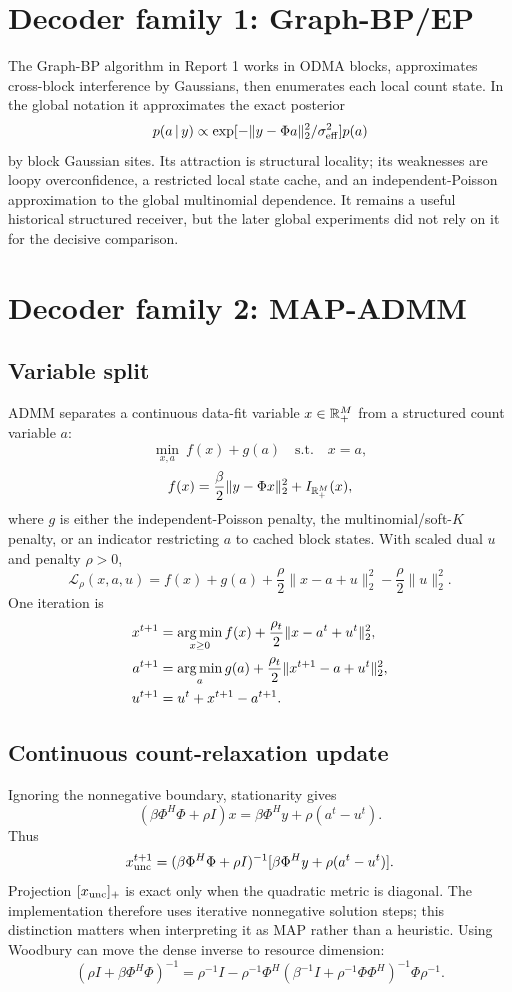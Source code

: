 \documentclass[11pt]{article}
\begin{document}
\section{Decoder family 1: Graph-BP/EP}

The Graph-BP algorithm in Report 1 works in ODMA blocks, approximates cross-block interference by Gaussians, then
enumerates each local count state. In the global notation it approximates the exact posterior
\[
 p(a\,|\, y)\propto
 \exp[-\|y-\Phi a\|_2^2/\sigma_{\rm eff}^2]p(a)
\]
by block Gaussian sites. Its attraction is structural locality; its weaknesses are loopy overconfidence, a restricted
local state cache, and an independent-Poisson approximation to the global multinomial dependence. It remains a useful
historical structured receiver, but the later global experiments did not rely on it for the decisive comparison.

\section{Decoder family 2: MAP-ADMM}

\subsection{Variable split}

ADMM separates a continuous data-fit variable $x\in\mathbb{R}_+^M$ from a structured count variable $a$:
\[
 \min_{x,a}\ f(x)+g(a)\quad\text{s.t.}\quad x=a,
\]
\[
 f(x)=\frac{\beta}{2}\|y-\Phi x\|_2^2+I_{\mathbb{R}_+^M}(x),
\]
where $g$ is either the independent-Poisson penalty, the multinomial/soft-$K$ penalty, or an indicator restricting $a$
to cached block states. With scaled dual $u$ and penalty $\rho>0$,
\[
 \mathcal L_\rho(x,a,u)=f(x)+g(a)+\frac{\rho}{2}\|x-a+u\|_2^2-\frac{\rho}{2}\|u\|_2^2.
\]
One iteration is
\begin{align*}
 x^{t+1}&=\operatorname*{arg\,min}_{x\ge0}f(x)+\frac{\rho_t}{2}\|x-a^t+u^t\|_2^2,\\
 a^{t+1}&=\operatorname*{arg\,min}_a g(a)+\frac{\rho_t}{2}\|x^{t+1}-a+u^t\|_2^2,\\
 u^{t+1}&=u^t+x^{t+1}-a^{t+1}.
\end{align*}

\subsection{Continuous count-relaxation update}

Ignoring the nonnegative boundary, stationarity gives
\[
 (\beta\Phi^H\Phi+\rho I)x=\beta\Phi^Hy+\rho(a^t-u^t).
\]
Thus
\[
 x_{\rm unc}^{t+1}=(\beta\Phi^H\Phi+\rho I)^{-1}
 [\beta\Phi^Hy+\rho(a^t-u^t)].
\]
Projection $[x_{\rm unc}]_+$ is exact only when the quadratic metric is diagonal. The implementation therefore uses
iterative nonnegative solution steps; this distinction matters when interpreting it as MAP rather than a heuristic.
Using Woodbury can move the dense inverse to resource dimension:
\[
 (\rho I+\beta\Phi^H\Phi)^{-1}
 =\rho^{-1}I-\rho^{-1}\Phi^H(\beta^{-1}I+\rho^{-1}\Phi\Phi^H)^{-1}\Phi\rho^{-1}.
\]
\end{document}
